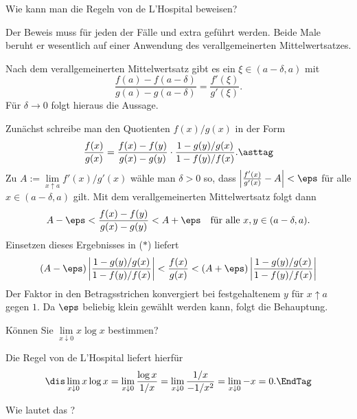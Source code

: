 \begin{frage}
Wie kann man die Regeln von de L'Hospital beweisen?
\end{frage}

\begin{antwort}
 Der Beweis muss für jeden der Fälle  und 
 extra geführt werden. Beide Male beruht er wesentlich 
auf einer Anwendung des verallgemeinerten Mittelwertsatzes. 

\medskip
\noindent
{} Nach dem verallgemeinerten Mittelwertsatz gibt es ein 
$\xi \in (a-\delta,a)$ mit
\[
\frac{f(a)-f(a-\delta)}{g(a)-g(a-\delta)} = \frac{f'(\xi)}{g'(\xi)}.
\]
Für $\delta \to 0$ folgt hieraus die Aussage. 

\medskip
\noindent
{} Zunächst schreibe man den Quotienten $f(x)/g(x)$ in der Form  
\begin{equation}
\frac{f(x)}{g(x)} = \frac{f(x)-f(y)}{g(x)-g(y)} \cdot 
\frac{1-g(y)/g(x)}{1-f(y)/f(x)}. 
\asttag
\end{equation}
Zu $A:= \lim\limits_{x\uparrow a}f'(x)/g'(x)$ wähle man $\delta>0$ so, 
dass $\left|  \frac{f'(x)}{g'(x)} - A \right| <\eps$ 
für alle $x\in (a-\delta, a )$ gilt. Mit 
dem verallgemeinerten Mittelwertsatz folgt dann
\[
A-\eps <   
\frac{f(x)-f(y)}{g(x)-g(y)} < A+\eps  
\quad\text{für alle $x,y \in (a-\delta, a)$.}
\]
Einsetzen dieses Ergebnisses in ($\ast$) liefert
\[
(A-\eps) \left| \frac{1-g(y)/g(x)}{1-f(y)/f(x)} \right|  < 
\frac{f(x)}{g(x)} < 
(A+\eps) \left| \frac{1-g(y)/g(x)}{1-f(y)/f(x)} \right|
\]
Der Faktor in den Betragsstrichen konvergiert bei 
festgehaltenem $y$ für $x\!\uparrow \!a$ gegen $1$. 
Da $\eps$ beliebig klein gewählt werden kann, folgt die Behauptung.
\AntEnd
\end{antwort}

\begin{frage}
Können Sie $\lim\limits_{x\downarrow 0} x\log x$ bestimmen?
\end{frage}

\begin{antwort}
Die Regel von de L'Hospital liefert hierfür 
\begin{equation}
\dis \lim_{x\downarrow 0} x \log x = 
\lim_{x\downarrow 0} \frac{\log x}{1/x} = \lim_{x\downarrow 0}
\frac{1/x}{-1/x^2} = \lim_{x\downarrow 0} -x = 0.
\EndTag
\end{equation}
\end{antwort}

\begin{frage}
Wie lautet das  ?
\end{frage}

